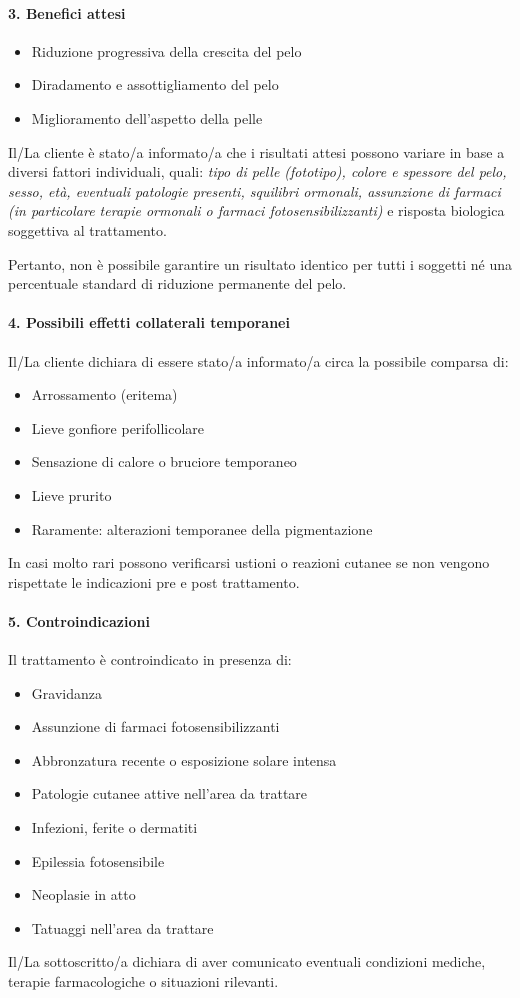 \paragraph*{3. Benefici attesi}
\begin{itemize}
    \item Riduzione progressiva della crescita del pelo
    \item Diradamento e assottigliamento del pelo
    \item Miglioramento dell'aspetto della pelle
\end{itemize}
Il/La cliente è stato/a informato/a che i risultati attesi possono variare in base a diversi fattori individuali, quali: \textit{tipo di pelle (fototipo), colore e spessore del pelo, sesso, età, eventuali patologie presenti, squilibri ormonali, assunzione di farmaci (in particolare terapie ormonali o farmaci fotosensibilizzanti)} e risposta biologica soggettiva al trattamento.

Pertanto, non è possibile garantire un risultato identico per tutti i soggetti né una percentuale standard di riduzione permanente del pelo.

\paragraph*{4. Possibili effetti collaterali temporanei}
Il/La cliente dichiara di essere stato/a informato/a circa la possibile comparsa di:
\begin{itemize}
    \item Arrossamento (eritema)
    \item Lieve gonfiore perifollicolare
    \item Sensazione di calore o bruciore temporaneo
    \item Lieve prurito
    \item Raramente: alterazioni temporanee della pigmentazione
\end{itemize}
In casi molto rari possono verificarsi ustioni o reazioni cutanee se non vengono rispettate le indicazioni pre e post trattamento.

\paragraph*{5. Controindicazioni}
Il trattamento è controindicato in presenza di:
\begin{itemize}
    \item Gravidanza
    \item Assunzione di farmaci fotosensibilizzanti
    \item Abbronzatura recente o esposizione solare intensa
    \item Patologie cutanee attive nell'area da trattare
    \item Infezioni, ferite o dermatiti
    \item Epilessia fotosensibile
    \item Neoplasie in atto
    \item Tatuaggi nell'area da trattare
\end{itemize}
Il/La sottoscritto/a dichiara di aver comunicato eventuali condizioni mediche, terapie farmacologiche o situazioni rilevanti.

